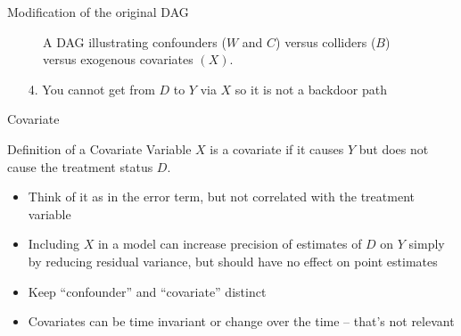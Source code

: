 \documentclass{beamer}
\begin{document}
\begin{frame}{Modification of the original DAG}

\begin{figure}
\begin{center}
\caption{A DAG illustrating confounders ($W$ and $C$) versus colliders ($B$) versus exogenous covariates $(X)$.}
\label{fig:backdoor_dag}
\end{center}
\end{figure}

\begin{enumerate}
\item[4. ] You cannot get from $D$ to $Y$ via $X$ so it is not a backdoor path
\end{enumerate}


\end{frame}




\begin{frame}{Covariate}
	
	
	\begin{block}{Definition of a Covariate}
	Variable $X$ is a covariate if it causes $Y$ but does not cause the treatment status $D$.
	\end{block}
	
	\begin{itemize}
	\item Think of it as in the error term, but not correlated with the treatment variable
	\item Including $X$ in a model can increase precision of estimates of $D$ on $Y$ simply by reducing residual variance, but should have no effect on point estimates
	\item Keep ``confounder'' and ``covariate'' distinct
	\item Covariates can be time invariant or change over the time -- that's not relevant
	\end{itemize}
	
\end{frame}
\end{document}
